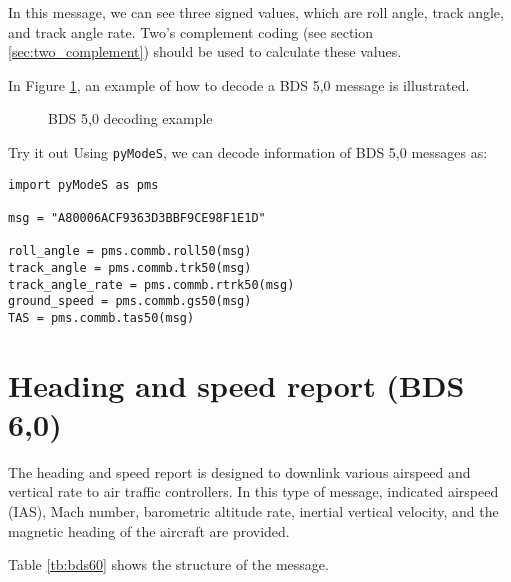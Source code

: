 In this message, we can see three signed values, which are roll angle, track angle, and track angle rate. Two's complement coding (see section \ref{sec:two_complement}) should be used to calculate these values.

In Figure \ref{fig:bds50_example}, an example of how to decode a BDS 5,0 message is illustrated.

\begin{figure}[ht]
  \centering
  
  \vspace{0.5cm}
  \caption{BDS 5,0 decoding example}
  \label{fig:bds50_example}
\end{figure}

\begin{notebox}{Try it out}
Using \texttt{pyModeS}, we can decode information of BDS 5,0 messages as: 

\begin{verbatim}
import pyModeS as pms

msg = "A80006ACF9363D3BBF9CE98F1E1D"

roll_angle = pms.commb.roll50(msg)
track_angle = pms.commb.trk50(msg)
track_angle_rate = pms.commb.rtrk50(msg)
ground_speed = pms.commb.gs50(msg)
TAS = pms.commb.tas50(msg)
\end{verbatim}

\end{notebox}


\clearpage

\section{Heading and speed report (BDS 6,0)}

The heading and speed report is designed to downlink various airspeed and vertical rate to air traffic controllers. In this type of message, indicated airspeed (IAS), Mach number, barometric altitude rate, inertial vertical velocity, and the magnetic heading of the aircraft are provided.

Table \ref{tb:bds60} shows the structure of the message.


